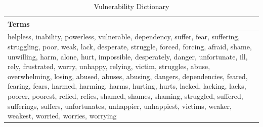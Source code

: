 \begin{table}[ht]
\centering
\begin{tabular}{l}
  \hline
Terms \\ 
  \hline
helpless, inability, powerless, vulnerable, dependency, suffer, fear, suffering, struggling, poor, weak, lack, desperate, struggle, forced, forcing, afraid, shame, unwilling, harm, alone, hurt, impossible, desperately, danger, unfortunate, ill, rely, frustrated, worry, unhappy, relying, victim, struggles, abuse, overwhelming, losing, abused, abuses, abusing, dangers, dependencies, feared, fearing, fears, harmed, harming, harms, hurting, hurts, lacked, lacking, lacks, poorer, poorest, relied, relies, shamed, shames, shaming, struggled, suffered, sufferings, suffers, unfortunates, unhappier, unhappiest, victims, weaker, weakest, worried, worries, worrying \\ 
   \hline
\end{tabular}
\caption{Vulnerability Dictionary} 
\end{table}
